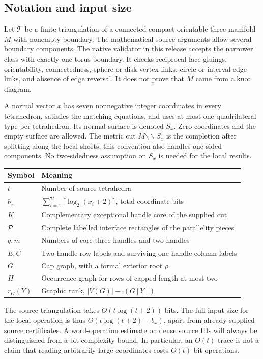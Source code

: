 \subsection{Notation and input size}

Let $\mathcal T$ be a finite triangulation of a connected compact orientable
three-manifold $M$ with nonempty boundary. The mathematical source arguments
allow several boundary components. The native validator in this release
accepts the narrower class with exactly one torus boundary. It checks
reciprocal face gluings, orientability, connectedness, sphere or disk vertex
links, circle or interval edge links, and absence of edge reversal. It does
not prove that $M$ came from a knot diagram.

A normal vector $x$ has seven nonnegative integer coordinates in every
tetrahedron, satisfies the matching equations, and uses at most one
quadrilateral type per tetrahedron. Its normal surface is denoted $S_x$.
Zero coordinates and the empty surface are allowed. The metric cut
$M\mathbin{\backslash\!\backslash}S_x$ is the completion after splitting
along the local sheets; this convention also handles one-sided components.
No two-sidedness assumption on $S_x$ is needed for the local results.

\begin{center}
\begin{tabular}{@{}ll@{}}
\toprule
Symbol & Meaning\\
\midrule
$t$ & Number of source tetrahedra\\
$b_x$ & $\sum_{i=1}^{7t}\lceil\log_2(x_i+2)\rceil$, total coordinate bits\\
$K$ & Complementary exceptional handle core of the supplied cut\\
$\mathcal P$ & Complete labelled interface rectangles of the parallelity pieces\\
$q,m$ & Numbers of core three-handles and two-handles\\
$E,C$ & Two-handle row labels and surviving one-handle column labels\\
$G$ & Cap graph, with a formal exterior root $\rho$\\
$H$ & Occurrence graph for rows of capped length at most two\\
$r_G(Y)$ & Graphic rank, $|V(G)|-\comp(G[Y])$\\
\bottomrule
\end{tabular}
\end{center}

The source triangulation takes $O(t\log(t+2))$ bits. The full input size for
the local operation is thus $O(t\log(t+2)+b_x)$, apart from already supplied
source certificates. A word-operation estimate on dense source IDs will
always be distinguished from a bit-complexity bound. In particular, an
$O(t)$ trace is not a claim that reading arbitrarily large coordinates costs
$O(t)$ bit operations.
